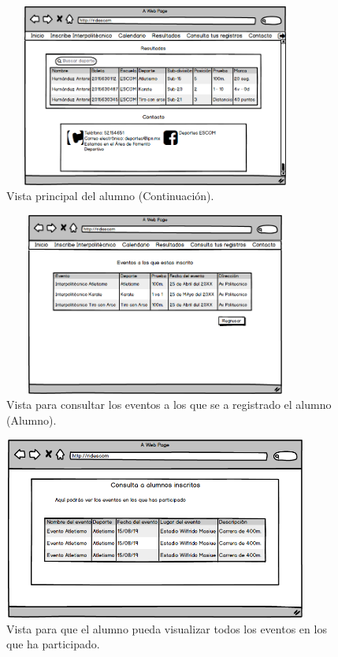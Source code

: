 		\begin{figure} [hbt!]
			\centering
			\includegraphics[width=10cm, height=6cm]{Imagenes/Nuevos/P19_Inicio_paticipante1}
			\caption{Vista principal del alumno (Continuación).}
			\label{principalalum1}
		\end{figure}
	
		\begin{figure} [hbt!]
			\centering
			\includegraphics[width=10cm, height=6cm]{Imagenes/Nuevos/P20_Consulta_Inscripciones}
			\caption{Vista para consultar los eventos a los que se a registrado el alumno (Alumno).}
			\label{consultainscripcion}
		\end{figure}
	\pagebreak
		
		\begin{figure} [hbt!]
			\centering
			\includegraphics[width=10cm, height=6cm]{Imagenes/Nuevos/P21_Historial}
			\caption{Vista para que el alumno pueda visualizar todos los eventos en los que ha participado.}
			\label{historial}
		\end{figure}
		
